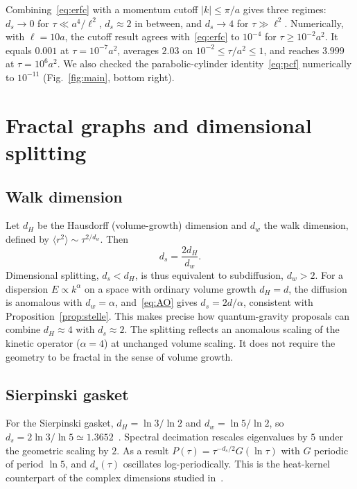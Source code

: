\documentclass[11pt]{article}
\theoremstyle{remark}\newtheorem*{remark}{Remark}
\begin{document}
Combining~\eqref{eq:erfc} with a momentum cutoff $|k|\le\pi/a$ gives three regimes:
$d_s\to0$ for $\tau\ll a^4/\ell^2$, $d_s\approx2$ in between, and $d_s\to4$ for $\tau\gg\ell^2$. Numerically, with $\ell=10a$, the cutoff
result agrees with~\eqref{eq:erfc} to $10^{-4}$ for $\tau\ge10^{-2}a^2$. It equals $0.001$ at $\tau=10^{-7}a^2$, averages $2.03$
on $10^{-2}\le\tau/a^2\le1$, and reaches $3.999$ at $\tau=10^6a^2$. We also checked the parabolic-cylinder
identity~\eqref{eq:pcf} numerically to $10^{-11}$ (Fig.~\ref{fig:main}, bottom right).

\section{Fractal graphs and dimensional splitting}
\label{sec:splitting}

\subsection{Walk dimension}
Let $d_H$ be the Hausdorff (volume-growth) dimension and $d_w$ the walk dimension, defined by
$\langle r^2\rangle\sim\tau^{2/d_w}$. Then~\cite{AlexanderOrbach,RammalToulouse}
\begin{equation}
d_s=\frac{2d_H}{d_w}.
\label{eq:AO}
\end{equation}
Dimensional splitting, $d_s<d_H$, is thus equivalent to subdiffusion, $d_w>2$. For a dispersion $E\propto k^\alpha$
on a space with ordinary volume growth $d_H=d$, the diffusion is anomalous with $d_w=\alpha$, and~\eqref{eq:AO} gives
$d_s=2d/\alpha$, consistent with Proposition~\ref{prop:stelle}. This makes precise how quantum-gravity
proposals can combine $d_H\approx4$ with $d_s\approx2$. The splitting reflects an anomalous scaling of the kinetic
operator ($\alpha=4$) at unchanged volume scaling. It does not require the geometry to be fractal in the sense of
volume growth.

\subsection{Sierpinski gasket}
For the Sierpinski gasket, $d_H=\ln3/\ln2$ and $d_w=\ln5/\ln2$, so $d_s=2\ln3/\ln5\simeq1.3652$~\cite{RammalToulouse}.
Spectral decimation rescales eigenvalues by $5$ under the geometric scaling by $2$. As a result
$P(\tau)=\tau^{-d_s/2}G(\ln\tau)$ with $G$ periodic of period $\ln5$, and $d_s(\tau)$ oscillates log-periodically. This is
the heat-kernel counterpart of the complex dimensions studied in~\cite{ADT}.
\end{document}

